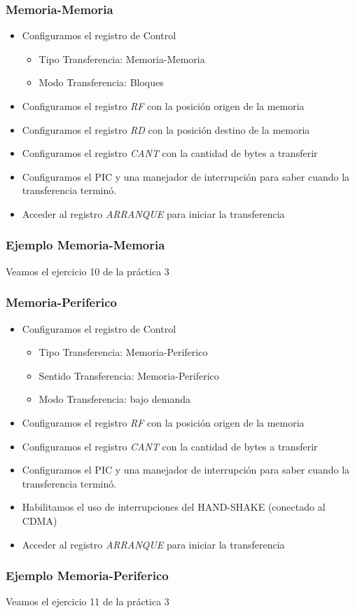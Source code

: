 \documentclass{beamer}
\begin{document}
\begin{frame}
\frametitle{Memoria-Memoria}
  \begin{itemize}
     \item Configuramos el registro de Control
     \begin{itemize}
	\item Tipo Transferencia: Memoria-Memoria
        \item Modo Transferencia: Bloques
     \end{itemize}
     \item Configuramos el registro \emph{RF} con la posición origen de la memoria
     \item Configuramos el registro \emph{RD} con la posición destino de la memoria
     \item Configuramos el registro \emph{CANT} con la cantidad de bytes a transferir
     \item Configuramos el PIC y una manejador de interrupción para saber cuando la transferencia terminó.
     \item Acceder al registro \emph{ARRANQUE} para iniciar la transferencia
  \end{itemize}
\end{frame}

\begin{frame}
\frametitle{Ejemplo Memoria-Memoria}
Veamos el ejercicio 10 de la práctica 3
\end{frame}

\begin{frame}
\frametitle{Memoria-Periferico}
  \begin{itemize}
     \item Configuramos el registro de Control
     \begin{itemize}
	\item Tipo Transferencia: Memoria-Periferico
        \item Sentido Transferencia: Memoria-Periferico
        \item Modo Transferencia: bajo demanda
     \end{itemize}
     \item Configuramos el registro \emph{RF} con la posición origen de la memoria
     \item Configuramos el registro \emph{CANT} con la cantidad de bytes a transferir
     \item Configuramos el PIC y una manejador de interrupción para saber cuando la transferencia terminó.
     \item Habilitamos el uso de interrupciones del HAND-SHAKE (conectado al CDMA)
     \item Acceder al registro \emph{ARRANQUE} para iniciar la transferencia
  \end{itemize}
\end{frame}

\begin{frame}
\frametitle{Ejemplo Memoria-Periferico}
Veamos el ejercicio 11 de la práctica 3
\end{frame}
\end{document}
